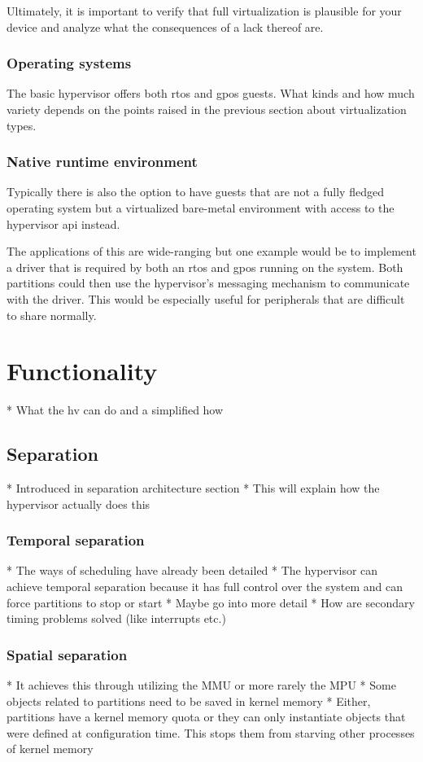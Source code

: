 Ultimately, it is important to verify that full virtualization is plausible for your device and analyze what the consequences of a lack thereof are.
\subsubsection{Operating systems}
The basic hypervisor offers both \acrfull{rtos} and \acrfull{gpos} guests. What kinds and how much variety depends on the points raised in the previous section about virtualization types. 
\subsubsection{Native runtime environment}
Typically there is also the option to have guests that are not a fully fledged operating system but a virtualized bare-metal environment with access to the hypervisor \acrshort{api} instead. 

The applications of this are wide-ranging but one example would be to implement a driver that is required by both an \acrshort{rtos} and \acrshort{gpos} running on the system. Both partitions could then use the hypervisor's messaging mechanism to communicate with the driver. This would be especially useful for peripherals that are difficult to share normally.


\section{Functionality}
* What the hv can do and a simplified how
\subsection{Separation}
* Introduced in separation architecture section 
* This will explain how the hypervisor actually does this
\subsubsection{Temporal separation}
* The ways of scheduling have already been detailed
* The hypervisor can achieve temporal separation because it has full control over the system and can force partitions to stop or start
* Maybe go into more detail
* How are secondary timing problems solved (like interrupts etc.)
\subsubsection{Spatial separation}
* It achieves this through utilizing the MMU or more rarely the MPU
* Some objects related to partitions need to be saved in kernel memory
* Either, partitions have a kernel memory quota or they can only instantiate objects that were defined at configuration time. This stops them from starving other processes of kernel memory
